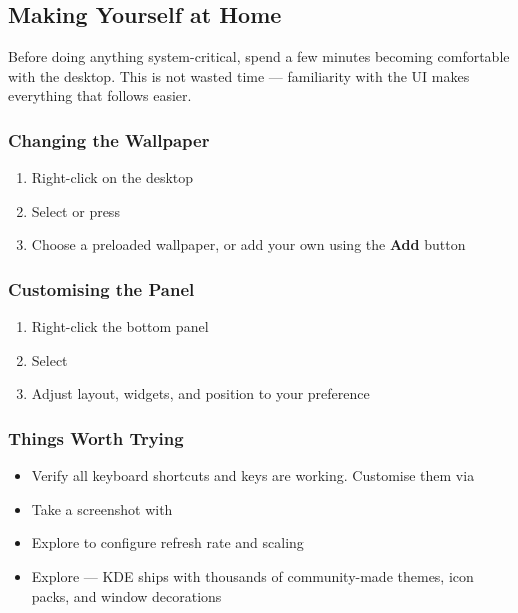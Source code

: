 \documentclass{article}
\begin{document}
\subsection{Making Yourself at Home}

Before doing anything system-critical, spend a few minutes becoming comfortable
with the desktop. This is not wasted time --- familiarity with the UI makes
everything that follows easier.

\subsubsection{Changing the Wallpaper}

\begin{enumerate}[leftmargin=1.5em, nosep, label={\arabic*.}]
	\item Right-click on the desktop
	\item Select  or press 
	\item Choose a preloaded wallpaper, or add your own using the \textbf{Add} button
\end{enumerate}

\subsubsection{Customising the Panel}

\begin{enumerate}[leftmargin=1.5em, nosep, label={\arabic*.}]
	\item Right-click the bottom panel
	\item Select 
	\item Adjust layout, widgets, and position to your preference
\end{enumerate}

\subsubsection{Things Worth Trying}

\begin{itemize}[leftmargin=1.5em, label={\tiny\textbullet}, nosep]
	\item Verify all keyboard shortcuts and keys are working. Customise them via
	\item Take a screenshot with 
	\item Explore  to configure refresh
	rate and scaling
	\item Explore  --- KDE ships with thousands
	of community-made themes, icon packs, and window decorations
\end{itemize}
\end{document}
